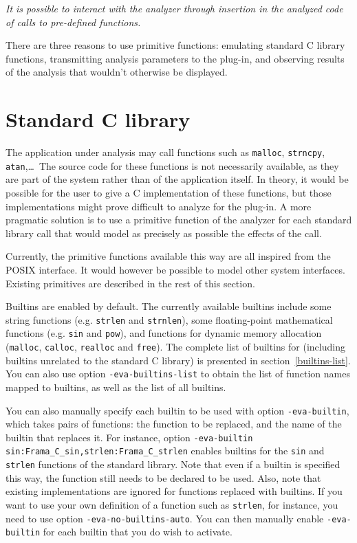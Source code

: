 \documentclass{frama-c-book}
\begin{document}
{\em It is possible to interact with the analyzer
through insertion in the analyzed code of calls to
pre-defined functions.}

\vspace{2cm}

There are three reasons to use primitive functions:
emulating standard C library functions, transmitting
analysis parameters to the plug-in,
and observing results of the analysis that wouldn't otherwise
be displayed.

\section{Standard C library}
\label{libc}

The application under analysis may call functions such as
\lstinline|malloc|, \lstinline|strncpy|, \lstinline|atan|,\ldots\
The source code for these functions is not necessarily available, as
they are part of the system rather than of the application itself. In
theory, it would be possible for the user to give a C implementation
of these functions, but those implementations might prove difficult to
analyze for the \Eva{} plug-in. A more pragmatic solution is to use a
primitive function of the analyzer for each standard library call that
would model as precisely as possible the effects of the call.

Currently, the primitive functions available this way are all inspired
from the \mbox{POSIX} interface. It would however be possible to model
other system interfaces. Existing primitives are described in the rest
of this section.

Builtins are enabled by default. The currently available builtins include
some string functions (e.g. \lstinline|strlen| and \lstinline|strnlen|),
some floating-point mathematical functions (e.g. \lstinline|sin| and
\lstinline|pow|), and functions for dynamic memory allocation
(\lstinline|malloc|, \lstinline|calloc|, \lstinline|realloc| and
\lstinline|free|).
%
The complete list of builtins for \Eva{} (including builtins
unrelated to the standard C library) is presented in
section~\ref{builtins-list}.
%
You can also use option \lstinline|-eva-builtins-list| to obtain the list of
function names mapped to builtins, as well as the list of all builtins.

You can also manually specify each builtin to be used with option
\lstinline|-eva-builtin|, which takes pairs of functions:
the function to be replaced, and the name of the builtin that replaces it.
For instance, option
\lstinline|-eva-builtin sin:Frama_C_sin,strlen:Frama_C_strlen| enables
builtins for the \lstinline|sin| and \lstinline|strlen| functions of the
standard library. Note that even if a builtin is specified this way,
the function still needs to be declared to be used.
%
Also, note that existing implementations are ignored
for functions replaced with builtins. If you want \Eva{} to use your own definition
of a function such as \lstinline|strlen|, for instance, you need to use option
\lstinline|-eva-no-builtins-auto|. You can then manually enable
\lstinline|-eva-builtin| for each builtin that you do wish to activate.
\end{document}
